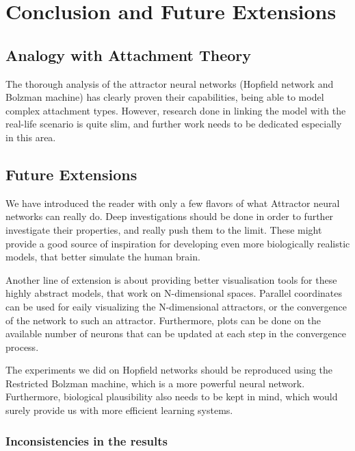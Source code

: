 \chapter{Conclusion and Future Extensions}

\section{Analogy with Attachment Theory}

The thorough analysis of the attractor neural networks (Hopfield network and Bolzman machine) has clearly proven their capabilities, being able to model complex attachment types. However, research done in linking the model with the real-life scenario is quite slim, and further work needs to be dedicated especially in this area. 

\section{Future Extensions}

We have introduced the reader with only a few flavors of what Attractor neural networks can really do. Deep investigations should be done in order to further investigate their properties, and really push them to the limit. These might provide a good source of inspiration for developing even more biologically realistic models, that better simulate the human brain.

Another line of extension is about providing better visualisation tools for these highly abstract models, that work on N-dimensional spaces. Parallel coordinates can be used for eaily visualizing the N-dimensional attractors, or the convergence of the network to such an attractor. Furthermore, plots can be done on the available number of neurons that can be updated at each step in the convergence process. 

The experiments we did on Hopfield networks should be reproduced using the Restricted Bolzman machine, which is a more powerful neural network. Furthermore, biological plausibility also needs to be kept in mind, which would surely provide us with more efficient learning systems.

\subsection{Inconsistencies in the results}
\label{inconsistencies}

